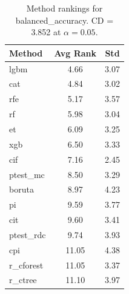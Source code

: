 \begin{table}[h]
\centering
\caption{Method rankings for balanced_accuracy. CD = 3.852 at $\alpha=0.05$.}
\label{tab:ranks_balanced_accuracy}
\begin{tabular}{lcc}
\toprule
Method & Avg Rank & Std \\
\midrule
lgbm & 4.66 & 3.07 \\
cat & 4.84 & 3.02 \\
rfe & 5.17 & 3.57 \\
rf & 5.98 & 3.04 \\
et & 6.09 & 3.25 \\
xgb & 6.50 & 3.33 \\
cif & 7.16 & 2.45 \\
ptest_mc & 8.50 & 3.29 \\
boruta & 8.97 & 4.23 \\
pi & 9.59 & 3.77 \\
cit & 9.60 & 3.41 \\
ptest_rdc & 9.74 & 3.93 \\
cpi & 11.05 & 4.38 \\
r_cforest & 11.05 & 3.37 \\
r_ctree & 11.10 & 3.97 \\
\bottomrule
\end{tabular}
\end{table}